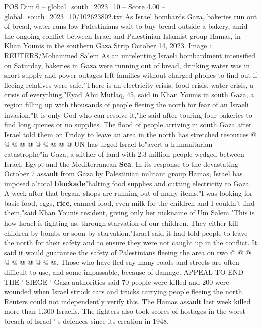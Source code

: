 \begin{textsample}{POS Dim 6 – global\_south\_2023\_10 – Score 4.00 – global\_south\_2023\_10/102623802.txt}  \label{ex:f6_pos_248}
As Israel bombards Gaza, bakeries run out of bread, water runs low Palestinians wait to buy bread outside a bakery, amid the ongoing conflict between Israel and Palestinian Islamist group Hamas, in Khan Younis in the southern Gaza Strip October 14, 2023.
Image : REUTERS/Mohammed Salem As an unrelenting Israeli bombardment intensified on Saturday, bakeries in Gaza were running out of bread, drinking water was in short supply and power outages left families without charged phones to find out if fleeing relatives were safe."There is an electricity crisis, food crisis, water crisis, a crisis of everything,"Eyad Abu Mutlaq, 45, said in Khan Younis in south Gaza, a region filling up with thousands of people fleeing the north for fear of an Israeli invasion."It is only God who can resolve it,"he said after touring four bakeries to find long queues or no supplies.
The flood of people arriving in south Gaza after Israel told them on Friday to leave an area in the north has stretched resources @ @ @ @ @ @ @ @ @ @ UN has urged Israel to"avert a humanitarian catastrophe"in Gaza, a slither of land with 2.3 million people wedged between Israel, Egypt and the Mediterranean \textbf{Sea}.
In its response to the devastating October 7 assault from Gaza by Palestinian militant group Hamas, Israel has imposed a"total \textbf{blockade}"halting food supplies and cutting electricity to Gaza.
A week after that began, shops are running out of many items."I was looking for basic food, eggs, \textbf{rice}, canned food, even milk for the children and I couldn't find them,"said Khan Younis resident, giving only her nickname of Um Salem."This is how Israel is fighting us, through starvation of our children.
They either kill children by bombs or soon by starvation."Israel said it had told people to leave the north for their safety and to ensure they were not caught up in the conflict.
It said it would guarantee the safety of Palestinians fleeing the area on two @ @ @ @ @ @ @ @ @ @.
Those who have fled say many roads and streets are often difficult to use, and some impassable, because of damage.
APPEAL TO END THE ' SIEGE ' Gaza authorities said 70 people were killed and 200 were wounded when Israel struck cars and trucks carrying people fleeing the north.
Reuters could not independently verify this.
The Hamas assault last week killed more than 1,300 Israelis.
The fighters also took scores of hostages in the worst breach of Israel ' s defences since its creation in 1948.

\end{textsample}
